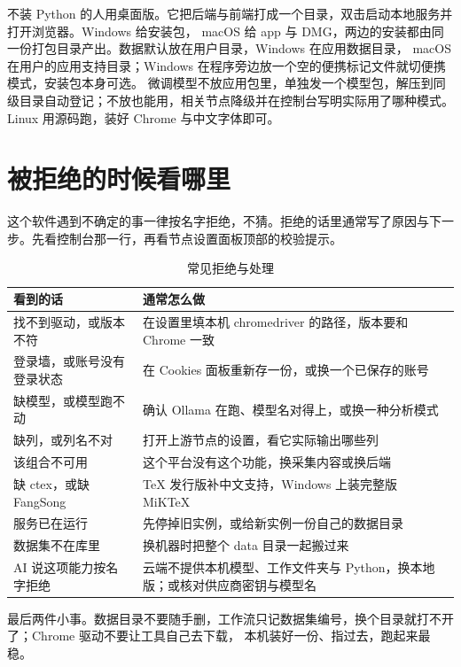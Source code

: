 不装 Python 的人用桌面版。它把后端与前端打成一个目录，双击启动本地服务并打开浏览器。Windows 给安装包，
macOS 给 app 与 DMG，两边的安装都由同一份打包目录产出。数据默认放在用户目录，Windows 在应用数据目录，
macOS 在用户的应用支持目录；Windows 在程序旁边放一个空的便携标记文件就切便携模式，安装包本身可选。
微调模型不放应用包里，单独发一个模型包，解压到同级目录自动登记；不放也能用，相关节点降级并在控制台写明实际用了哪种模式。
Linux 用源码跑，装好 Chrome 与中文字体即可。

\section{被拒绝的时候看哪里}

这个软件遇到不确定的事一律按名字拒绝，不猜。拒绝的话里通常写了原因与下一步。先看控制台那一行，再看节点设置面板顶部的校验提示。

\begin{table}[H]\centering
\caption{常见拒绝与处理}
\label{tab:refuse}
\small
\begin{tabularx}{\textwidth}{p{4.4cm}X}
\toprule
看到的话 & 通常怎么做 \\
\midrule
找不到驱动，或版本不符 & 在设置里填本机 chromedriver 的路径，版本要和 Chrome 一致 \\
登录墙，或账号没有登录状态 & 在 Cookies 面板重新存一份，或换一个已保存的账号 \\
缺模型，或模型跑不动 & 确认 Ollama 在跑、模型名对得上，或换一种分析模式 \\
缺列，或列名不对 & 打开上游节点的设置，看它实际输出哪些列 \\
该组合不可用 & 这个平台没有这个功能，换采集内容或换后端 \\
缺 ctex，或缺 FangSong & TeX 发行版补中文支持，Windows 上装完整版 MiKTeX \\
服务已在运行 & 先停掉旧实例，或给新实例一份自己的数据目录 \\
数据集不在库里 & 换机器时把整个 data 目录一起搬过来 \\
AI 说这项能力按名字拒绝 & 云端不提供本机模型、工作文件夹与 Python，换本地版；或核对供应商密钥与模型名 \\
\bottomrule
\end{tabularx}
\end{table}

最后两件小事。数据目录不要随手删，工作流只记数据集编号，换个目录就打不开了；Chrome 驱动不要让工具自己去下载，
本机装好一份、指过去，跑起来最稳。
